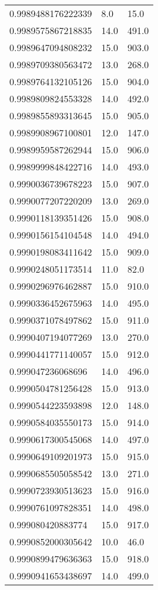 \begin{center}
\begin{supertabular}[H]{p{0.30\textwidth}p{0.05\textwidth}p{0.05\textwidth}}
0.9989488176222339 & 8.0 & 15.0 \\ 
0.9989575867218835 & 14.0 & 491.0 \\ 
0.9989647094808232 & 15.0 & 903.0 \\ 
0.9989709380563472 & 13.0 & 268.0 \\ 
0.9989764132105126 & 15.0 & 904.0 \\ 
0.9989809824553328 & 14.0 & 492.0 \\ 
0.9989855893313645 & 15.0 & 905.0 \\ 
0.9989908967100801 & 12.0 & 147.0 \\ 
0.9989959587262944 & 15.0 & 906.0 \\ 
0.9989999848422716 & 14.0 & 493.0 \\ 
0.9990036739678223 & 15.0 & 907.0 \\ 
0.9990077207220209 & 13.0 & 269.0 \\ 
0.9990118139351426 & 15.0 & 908.0 \\ 
0.9990156154104548 & 14.0 & 494.0 \\ 
0.9990198083411642 & 15.0 & 909.0 \\ 
0.9990248051173514 & 11.0 & 82.0 \\ 
0.9990296976462887 & 15.0 & 910.0 \\ 
0.9990336452675963 & 14.0 & 495.0 \\ 
0.9990371078497862 & 15.0 & 911.0 \\ 
0.9990407194077269 & 13.0 & 270.0 \\ 
0.9990441771140057 & 15.0 & 912.0 \\ 
0.999047236068696 & 14.0 & 496.0 \\ 
0.9990504781256428 & 15.0 & 913.0 \\ 
0.9990544223593898 & 12.0 & 148.0 \\ 
0.9990584035550173 & 15.0 & 914.0 \\ 
0.9990617300545068 & 14.0 & 497.0 \\ 
0.9990649109201973 & 15.0 & 915.0 \\ 
0.9990685505058542 & 13.0 & 271.0 \\ 
0.9990723930513623 & 15.0 & 916.0 \\ 
0.9990761097828351 & 14.0 & 498.0 \\ 
0.999080420883774 & 15.0 & 917.0 \\ 
0.9990852000305642 & 10.0 & 46.0 \\ 
0.9990899479636363 & 15.0 & 918.0 \\ 
0.9990941653438697 & 14.0 & 499.0 \\ 

\end{supertabular}
\end{center}
